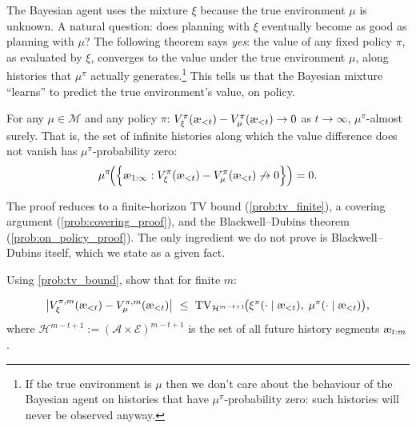 \documentclass[fontsize=11pt, parskip=half]{scrartcl}
\newcommand{\cA}{\mathcal{A}}
\newcommand{\cE}{\mathcal{E}}
\newcommand{\cH}{\mathcal{H}}
\newcommand{\cM}{\mathcal{M}}
\newcommand{\TV}[1][]{\mathrm{TV}_{#1}}
\newcommand{\aes}{\textnormal{\ae}}
\begin{document}
The Bayesian agent uses the mixture $\xi$ because the true environment $\mu$ is unknown.
A natural question: does planning with $\xi$ eventually become as good as planning with $\mu$?
The following theorem says \emph{yes}: the value of any fixed policy $\pi$, as evaluated by $\xi$, converges to the value under the true environment $\mu$, along histories that $\mu^\pi$ actually generates.\footnote{If the true environment is $\mu$ then we don't care about the behaviour of the Bayesian agent on histories that have $\mu^\pi$-probability zero: such histories will never be observed anyway.}
This tells us that the Bayesian mixture ``learns'' to predict the true environment's value, on policy.

\begin{theorem}\label{thm:on_policy}
For any $\mu \in \cM$ and any policy $\pi$:
$V_\xi^\pi(\aes_{<t}) - V_\mu^\pi(\aes_{<t}) \to 0$ as $t \to \infty$, $\mu^\pi$-almost surely.
That is, the set of infinite histories along which the value difference does not vanish has $\mu^\pi$-probability zero:
\[
    \mu^\pi\!\Big(\Big\{\aes_{1:\infty} : V_\xi^\pi(\aes_{<t}) - V_\mu^\pi(\aes_{<t}) \not\to 0\Big\}\Big) = 0.
\]
\end{theorem}

The proof reduces to a finite-horizon TV bound (\cref{prob:tv_finite}), a covering argument (\cref{prob:covering_proof}), and the Blackwell--Dubins theorem (\cref{prob:on_policy_proof}).
The only ingredient we do not prove is Blackwell--Dubins itself, which we state as a given fact.

\begin{exercise}
\label{prob:tv_finite}
Using \cref{prob:tv_bound}, show that for finite $m$:

\[
    \big|V_\xi^{\pi,m}(\aes_{<t}) - V_\mu^{\pi,m}(\aes_{<t})\big|
    ~\leq~ \TV[\cH^{m-t+1}]\!\big(\xi^\pi(\cdot \mid \aes_{<t}),\; \mu^\pi(\cdot \mid \aes_{<t})\big),
\]
where $\cH^{m-t+1} := (\cA \times \cE)^{m-t+1}$ is the set of all future history segments $\aes_{t:m}$.
\end{exercise}
\end{document}
